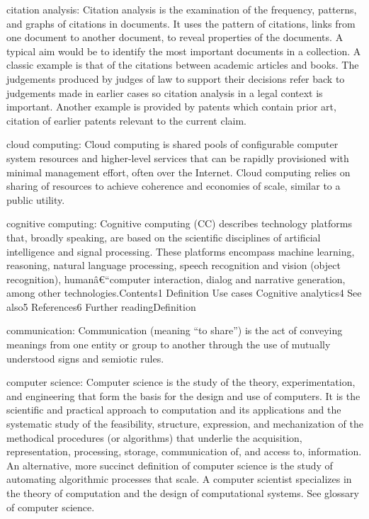 \documentclass[]{book}
\newcommand{\euro}{€}
\begin{document}
citation analysis: Citation analysis is the examination of the
frequency, patterns, and graphs of citations in documents. It uses the
pattern of citations, links from one document to another document, to
reveal properties of the documents. A typical aim would be to identify
the most important documents in a collection. A classic example is that
of the citations between academic articles and books. The judgements
produced by judges of law to support their decisions refer back to
judgements made in earlier cases so citation analysis in a legal context
is important. Another example is provided by patents which contain prior
art, citation of earlier patents relevant to the current claim.

cloud computing: Cloud computing is shared pools of configurable
computer system resources and higher-level services that can be rapidly
provisioned with minimal management effort, often over the Internet.
Cloud computing relies on sharing of resources to achieve coherence and
economies of scale, similar to a public utility.

cognitive computing: Cognitive computing (CC) describes technology
platforms that, broadly speaking, are based on the scientific
disciplines of artificial intelligence and signal processing. These
platforms encompass machine learning, reasoning, natural language
processing, speech recognition and vision (object recognition),
humanâ\euro{}``computer interaction, dialog and narrative generation,
among other technologies.Contents1 Definition Use cases Cognitive
analytics4 See also5 References6 Further readingDefinition

communication: Communication (meaning ``to share'') is the act of
conveying meanings from one entity or group to another through the use
of mutually understood signs and semiotic rules.

computer science: Computer science is the study of the theory,
experimentation, and engineering that form the basis for the design and
use of computers. It is the scientific and practical approach to
computation and its applications and the systematic study of the
feasibility, structure, expression, and mechanization of the methodical
procedures (or algorithms) that underlie the acquisition,
representation, processing, storage, communication of, and access to,
information. An alternative, more succinct definition of computer
science is the study of automating algorithmic processes that scale. A
computer scientist specializes in the theory of computation and the
design of computational systems. See glossary of computer science.
\end{document}
